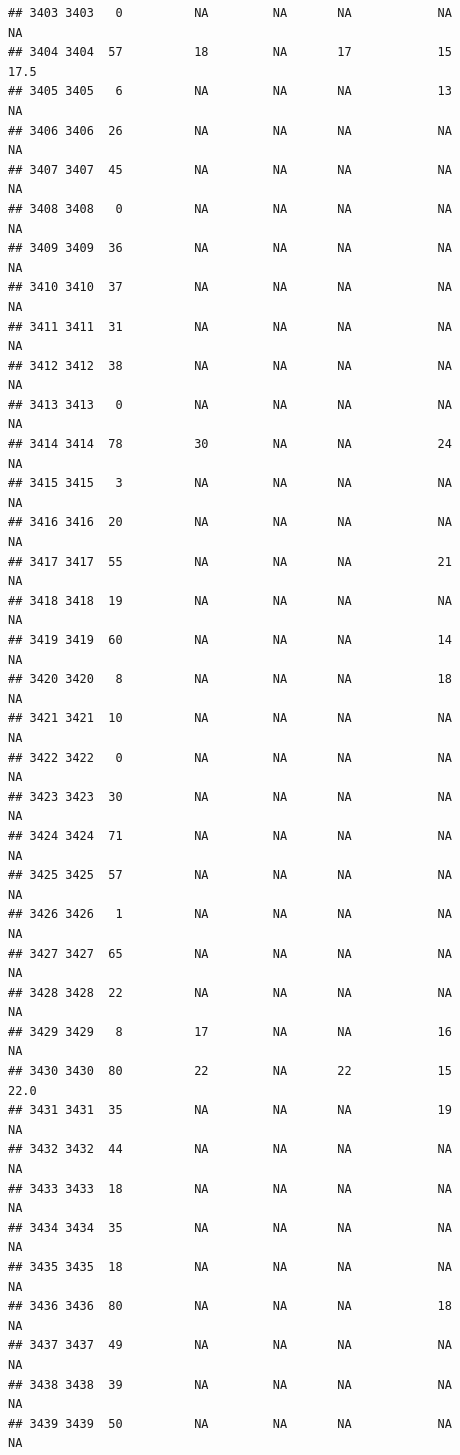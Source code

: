 \documentclass[man]{apa6}
\begin{document}
\begin{verbatim}
## 3403 3403   0          NA         NA       NA            NA       NA
## 3404 3404  57          18         NA       17            15     17.5
## 3405 3405   6          NA         NA       NA            13       NA
## 3406 3406  26          NA         NA       NA            NA       NA
## 3407 3407  45          NA         NA       NA            NA       NA
## 3408 3408   0          NA         NA       NA            NA       NA
## 3409 3409  36          NA         NA       NA            NA       NA
## 3410 3410  37          NA         NA       NA            NA       NA
## 3411 3411  31          NA         NA       NA            NA       NA
## 3412 3412  38          NA         NA       NA            NA       NA
## 3413 3413   0          NA         NA       NA            NA       NA
## 3414 3414  78          30         NA       NA            24       NA
## 3415 3415   3          NA         NA       NA            NA       NA
## 3416 3416  20          NA         NA       NA            NA       NA
## 3417 3417  55          NA         NA       NA            21       NA
## 3418 3418  19          NA         NA       NA            NA       NA
## 3419 3419  60          NA         NA       NA            14       NA
## 3420 3420   8          NA         NA       NA            18       NA
## 3421 3421  10          NA         NA       NA            NA       NA
## 3422 3422   0          NA         NA       NA            NA       NA
## 3423 3423  30          NA         NA       NA            NA       NA
## 3424 3424  71          NA         NA       NA            NA       NA
## 3425 3425  57          NA         NA       NA            NA       NA
## 3426 3426   1          NA         NA       NA            NA       NA
## 3427 3427  65          NA         NA       NA            NA       NA
## 3428 3428  22          NA         NA       NA            NA       NA
## 3429 3429   8          17         NA       NA            16       NA
## 3430 3430  80          22         NA       22            15     22.0
## 3431 3431  35          NA         NA       NA            19       NA
## 3432 3432  44          NA         NA       NA            NA       NA
## 3433 3433  18          NA         NA       NA            NA       NA
## 3434 3434  35          NA         NA       NA            NA       NA
## 3435 3435  18          NA         NA       NA            NA       NA
## 3436 3436  80          NA         NA       NA            18       NA
## 3437 3437  49          NA         NA       NA            NA       NA
## 3438 3438  39          NA         NA       NA            NA       NA
## 3439 3439  50          NA         NA       NA            NA       NA

\end{verbatim}
\end{document}
